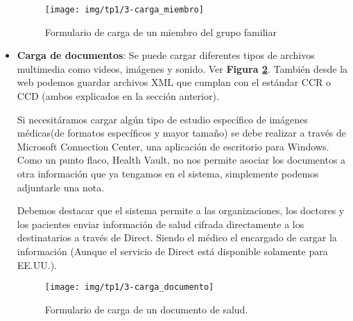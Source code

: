 \begin{itemize}
	\begin{figure}[h]
      \centering
      \texttt{[image: img/tp1/3-carga\_miembro]}
      \caption{Formulario de carga de un miembro del grupo familiar}
      \label{carga_miembro}
    \end{figure} 
    
\item \textbf{Carga de documentos}: Se puede cargar diferentes tipos de archivos multimedia como videos, imágenes y sonido. Ver \textbf{Figura \ref{carga_documento}}. 
También desde la web podemos guardar archivos XML que cumplan con el estándar CCR o CCD (ambos explicados en la sección anterior).

Si necesitáramos cargar algún tipo de estudio específico de imágenes médicas(de formatos específicos y mayor tamaño) se debe realizar a través de Microsoft Connection Center, una aplicación de escritorio para Windows. Como un punto flaco, Health Vault, no nos permite asociar los documentos a otra información que ya tengamos en el sistema, simplemente podemos adjuntarle una nota.

	Debemos destacar que el sistema permite a las organizaciones, los doctores y los pacientes enviar información de salud cifrada directamente a los destinatarios a través de Direct. 
    Siendo el médico el encargado de cargar la información (Aunque el servicio de Direct está disponible solamente para EE.UU.).%

    \begin{figure}[h]
      \centering
      \texttt{[image: img/tp1/3-carga\_documento]}
      \caption{Formulario de carga de un documento de salud.}
      \label{carga_documento}
    \end{figure} 


\end{itemize}
